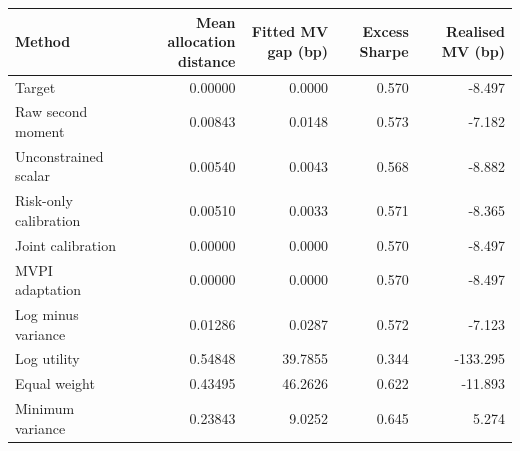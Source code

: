 \begin{tabular}{lrrrr}\toprule
Method & Mean allocation distance & Fitted MV gap (bp) & Excess Sharpe & Realised MV (bp)\\\midrule
Target & 0.00000 & 0.0000 & 0.570 & -8.497 \\
Raw second moment & 0.00843 & 0.0148 & 0.573 & -7.182 \\
Unconstrained scalar & 0.00540 & 0.0043 & 0.568 & -8.882 \\
Risk-only calibration & 0.00510 & 0.0033 & 0.571 & -8.365 \\
Joint calibration & 0.00000 & 0.0000 & 0.570 & -8.497 \\
MVPI adaptation & 0.00000 & 0.0000 & 0.570 & -8.497 \\
Log minus variance & 0.01286 & 0.0287 & 0.572 & -7.123 \\
Log utility & 0.54848 & 39.7855 & 0.344 & -133.295 \\
Equal weight & 0.43495 & 46.2626 & 0.622 & -11.893 \\
Minimum variance & 0.23843 & 9.0252 & 0.645 & 5.274 \\
\bottomrule\end{tabular}
